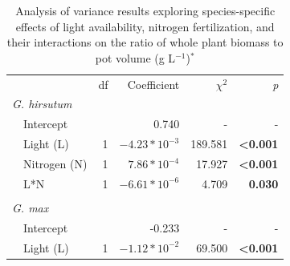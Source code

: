 \newpage
\begin{table}[]
    \caption[Analysis of variance results exploring species-specific effects of light availability, nitrogen fertilization, and their interactions on the ratio of whole plant biomass to pot volume]{Analysis of variance results exploring species-specific effects of light availability, nitrogen fertilization, and their interactions on the ratio of whole plant biomass to pot volume (g L$^{-1}$)$^*$}
    \label{table:tab.a2}
    \centering
        \begin{tabular}{p{0.1cm}p{2.5cm}p{0.5cm}p{1.75cm}p{1.5cm}p{1.5cm}}
         &&&&& 
         \\
         \hline 
         && 
         \multicolumn{1}{r}{df}
         & \multicolumn{1}{r}{Coefficient} & \multicolumn{1}{r}{$\chi^2$} & \multicolumn{1}{r}{\textit{p}}
         \\ 
         \hline
         
         \multicolumn{2}{l}{\textit{G. hirsutum}} &&&&  \\
         & Intercept 
         && \multicolumn{1}{r}{0.740} & \multicolumn{1}{r}{-} & \multicolumn{1}{r}{-} 
         \\
         
         & Light (L)            
         & \multicolumn{1}{r}{1}
         & \multicolumn{1}{r}{$-4.23*10^{-3}$}    & \multicolumn{1}{r}{189.581}    & \multicolumn{1}{r}{\textbf{<0.001}}
         \\
         
         & Nitrogen (N)
         & \multicolumn{1}{r}{1} 
         & \multicolumn{1}{r}{$7.86*10^{-4}$}    & \multicolumn{1}{r}{17.927}    & \multicolumn{1}{r}{\textbf{<0.001}}
         \\
         
         & L*N
         & \multicolumn{1}{r}{1}            
         & \multicolumn{1}{r}{$-6.61*10^{-6}$}     & \multicolumn{1}{r}{4.709}     & \multicolumn{1}{r}{\textbf{0.030}}              
         \\
         &&&&& \\

         \multicolumn{2}{l}{\textit{G. max}} &&&&  \\
         & Intercept 
         && \multicolumn{1}{r}{-0.233} & \multicolumn{1}{r}{-} & \multicolumn{1}{r}{-} 
         \\
         
         & Light (L)            
         & \multicolumn{1}{r}{1}
         & \multicolumn{1}{r}{$-1.12*10^{-2}$}    & \multicolumn{1}{r}{69.500}    & \multicolumn{1}{r}{\textbf{<0.001}}
         \\
         

\end{tabular}
\end{table}
